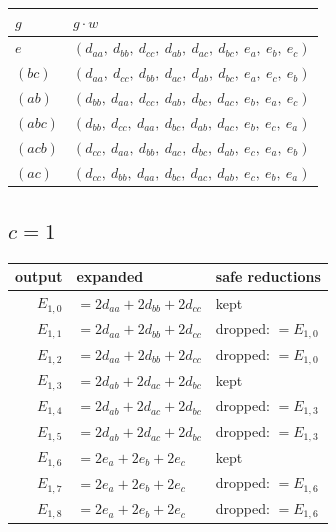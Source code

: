 \documentclass[10pt]{article}
\begin{document}
\begin{longtable}{ll}
$g$ & $g \cdot w$ \\ \hline
$e$ & $(d_{aa},\ d_{bb},\ d_{cc},\ d_{ab},\ d_{ac},\ d_{bc},\ e_{a},\ e_{b},\ e_{c})$ \\
$(b c)$ & $(d_{aa},\ d_{cc},\ d_{bb},\ d_{ac},\ d_{ab},\ d_{bc},\ e_{a},\ e_{c},\ e_{b})$ \\
$(a b)$ & $(d_{bb},\ d_{aa},\ d_{cc},\ d_{ab},\ d_{bc},\ d_{ac},\ e_{b},\ e_{a},\ e_{c})$ \\
$(a b c)$ & $(d_{bb},\ d_{cc},\ d_{aa},\ d_{bc},\ d_{ab},\ d_{ac},\ e_{b},\ e_{c},\ e_{a})$ \\
$(a c b)$ & $(d_{cc},\ d_{aa},\ d_{bb},\ d_{ac},\ d_{bc},\ d_{ab},\ e_{c},\ e_{a},\ e_{b})$ \\
$(a c)$ & $(d_{cc},\ d_{bb},\ d_{aa},\ d_{bc},\ d_{ac},\ d_{ab},\ e_{c},\ e_{b},\ e_{a})$ \\
\end{longtable}

\subsection*{$c = 1$}
\begin{longtable}{r>{\raggedright\arraybackslash}p{}>{\raggedright\arraybackslash}p{}}
output & expanded & safe reductions \\ \hline
$E_{1,0}$ & $= 2 d_{aa} + 2 d_{bb} + 2 d_{cc}$ & kept \\
$E_{1,1}$ & $= 2 d_{aa} + 2 d_{bb} + 2 d_{cc}$ & dropped: $= E_{1,0}$ \\
$E_{1,2}$ & $= 2 d_{aa} + 2 d_{bb} + 2 d_{cc}$ & dropped: $= E_{1,0}$ \\
$E_{1,3}$ & $= 2 d_{ab} + 2 d_{ac} + 2 d_{bc}$ & kept \\
$E_{1,4}$ & $= 2 d_{ab} + 2 d_{ac} + 2 d_{bc}$ & dropped: $= E_{1,3}$ \\
$E_{1,5}$ & $= 2 d_{ab} + 2 d_{ac} + 2 d_{bc}$ & dropped: $= E_{1,3}$ \\
$E_{1,6}$ & $= 2 e_{a} + 2 e_{b} + 2 e_{c}$ & kept \\
$E_{1,7}$ & $= 2 e_{a} + 2 e_{b} + 2 e_{c}$ & dropped: $= E_{1,6}$ \\
$E_{1,8}$ & $= 2 e_{a} + 2 e_{b} + 2 e_{c}$ & dropped: $= E_{1,6}$ \\
\end{longtable}
\end{document}
